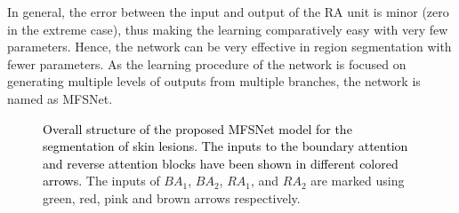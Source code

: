 \documentclass[review]{elsarticle}
\begin{document}
In general, the error between the input and output of the RA unit is minor (zero in the extreme case), thus making the learning comparatively easy with very few parameters. Hence, the network can be very effective in region segmentation with fewer parameters. As the learning procedure of the network is focused on generating multiple levels of outputs from multiple branches, the network is named as MFSNet.

\begin{figure*}[tbp]
    \centering
    \caption{\textcolor{black}{Overall structure of the proposed MFSNet model for the segmentation of skin lesions. The inputs to the boundary attention and reverse attention blocks have been shown in different colored arrows.} The inputs of $BA_1$, $BA_2$, $RA_1$, and $RA_2$ are marked using green, red, pink and brown arrows respectively.}
    \label{overall}
\end{figure*}
\end{document}
